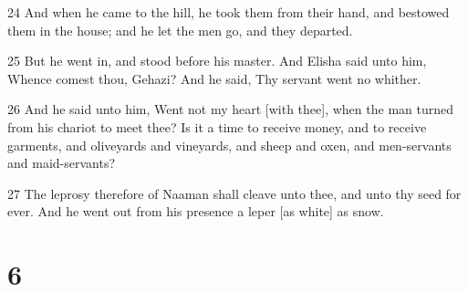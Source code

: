 \par 24 And when he came to the hill, he took them from their hand, and bestowed them in the house; and he let the men go, and they departed.
\par 25 But he went in, and stood before his master. And Elisha said unto him, Whence comest thou, Gehazi? And he said, Thy servant went no whither.
\par 26 And he said unto him, Went not my heart [with thee], when the man turned from his chariot to meet thee? Is it a time to receive money, and to receive garments, and oliveyards and vineyards, and sheep and oxen, and men-servants and maid-servants?
\par 27 The leprosy therefore of Naaman shall cleave unto thee, and unto thy seed for ever. And he went out from his presence a leper [as white] as snow.

\chapter{6}


